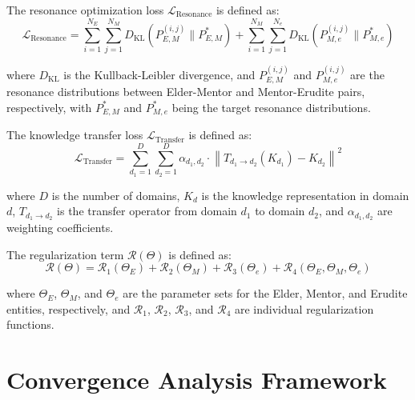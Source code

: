 \begin{definition}
The resonance optimization loss $\mathcal{L}_{\text{Resonance}}$ is defined as:
\begin{equation}
\mathcal{L}_{\text{Resonance}} = \sum_{i=1}^{N_E} \sum_{j=1}^{N_M} D_{\text{KL}}(P_{E,M}^{(i,j)} \| P_{E,M}^{*}) + \sum_{i=1}^{N_M} \sum_{j=1}^{N_e} D_{\text{KL}}(P_{M,e}^{(i,j)} \| P_{M,e}^{*})
\end{equation}

where $D_{\text{KL}}$ is the Kullback-Leibler divergence, and $P_{E,M}^{(i,j)}$ and $P_{M,e}^{(i,j)}$ are the resonance distributions between Elder-Mentor and Mentor-Erudite pairs, respectively, with $P_{E,M}^{*}$ and $P_{M,e}^{*}$ being the target resonance distributions.
\end{definition}

\begin{definition}
The knowledge transfer loss $\mathcal{L}_{\text{Transfer}}$ is defined as:
\begin{equation}
\mathcal{L}_{\text{Transfer}} = \sum_{d_1=1}^{D} \sum_{d_2=1}^{D} \alpha_{d_1,d_2} \cdot \left\|T_{d_1 \rightarrow d_2}(K_{d_1}) - K_{d_2}\right\|^2
\end{equation}

where $D$ is the number of domains, $K_{d}$ is the knowledge representation in domain $d$, $T_{d_1 \rightarrow d_2}$ is the transfer operator from domain $d_1$ to domain $d_2$, and $\alpha_{d_1,d_2}$ are weighting coefficients.
\end{definition}

\begin{definition}
The regularization term $\mathcal{R}(\Theta)$ is defined as:
\begin{equation}
\mathcal{R}(\Theta) = \mathcal{R}_1(\Theta_E) + \mathcal{R}_2(\Theta_M) + \mathcal{R}_3(\Theta_e) + \mathcal{R}_4(\Theta_E, \Theta_M, \Theta_e)
\end{equation}

where $\Theta_E$, $\Theta_M$, and $\Theta_e$ are the parameter sets for the Elder, Mentor, and Erudite entities, respectively, and $\mathcal{R}_1$, $\mathcal{R}_2$, $\mathcal{R}_3$, and $\mathcal{R}_4$ are individual regularization functions.
\end{definition}

\section{Convergence Analysis Framework}

